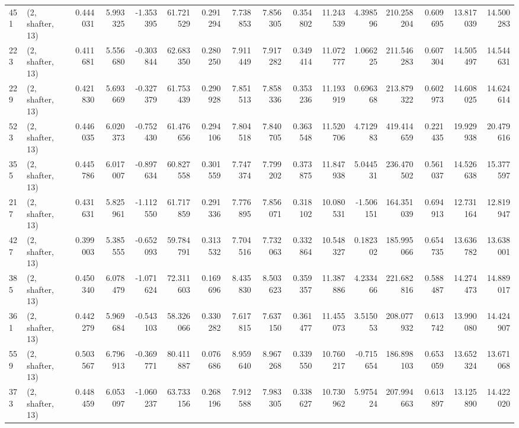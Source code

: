 \begin{tabular}{llrrrrrrrrrrrrrr}
451 &  (2, shafter, 13) &   0.444031 &   5.993325 &  -1.353395 &    61.721529 &   0.291294 &   7.738853 &   7.856305 &  0.354802 &  11.243539 &   4.398596 &   210.258204 &  0.609695 &  13.817039 &  14.500283 \\
223 &  (2, shafter, 13) &   0.411681 &   5.556680 &  -0.303844 &    62.683350 &   0.280250 &   7.911449 &   7.917282 &  0.349414 &  11.072777 &   1.066225 &   211.546283 &  0.607304 &  14.505497 &  14.544631 \\
229 &  (2, shafter, 13) &   0.421830 &   5.693669 &  -0.327379 &    61.753439 &   0.290928 &   7.851513 &   7.858336 &  0.353236 &  11.193919 &   0.696368 &   213.879322 &  0.602973 &  14.608025 &  14.624614 \\
523 &  (2, shafter, 13) &   0.446035 &   6.020373 &  -0.752430 &    61.476656 &   0.294106 &   7.804518 &   7.840705 &  0.363548 &  11.520706 &   4.712983 &   419.414659 &  0.221435 &  19.929938 &  20.479616 \\
355 &  (2, shafter, 13) &   0.445786 &   6.017007 &  -0.897634 &    60.827558 &   0.301559 &   7.747374 &   7.799202 &  0.373875 &  11.847938 &   5.044531 &   236.470502 &  0.561037 &  14.526638 &  15.377597 \\
217 &  (2, shafter, 13) &   0.431631 &   5.825961 &  -1.112550 &    61.717859 &   0.291336 &   7.776895 &   7.856071 &  0.318102 &  10.080531 &  -1.506151 &   164.351039 &  0.694913 &  12.731164 &  12.819947 \\
427 &  (2, shafter, 13) &   0.399003 &   5.385555 &  -0.652093 &    59.784791 &   0.313532 &   7.704516 &   7.732063 &  0.332864 &  10.548327 &   0.182302 &   185.995066 &  0.654735 &  13.636782 &  13.638001 \\
385 &  (2, shafter, 13) &   0.450340 &   6.078479 &  -1.071624 &    72.311603 &   0.169696 &   8.435830 &   8.503623 &  0.359357 &  11.387886 &   4.233466 &   221.682816 &  0.588487 &  14.274473 &  14.889017 \\
361 &  (2, shafter, 13) &   0.442279 &   5.969684 &  -0.543103 &    58.326066 &   0.330282 &   7.617815 &   7.637150 &  0.361477 &  11.455073 &   3.515053 &   208.077932 &  0.613742 &  13.990080 &  14.424907 \\
559 &  (2, shafter, 13) &   0.503567 &   6.796913 &  -0.369771 &    80.411887 &   0.076686 &   8.959640 &   8.967268 &  0.339550 &  10.760217 &  -0.715654 &   186.898103 &  0.653059 &  13.652324 &  13.671068 \\
373 &  (2, shafter, 13) &   0.448459 &   6.053097 &  -1.060237 &    63.733156 &   0.268196 &   7.912588 &   7.983305 &  0.338627 &  10.730962 &   5.975424 &   207.994663 &  0.613897 &  13.125890 &  14.422020 \\

\end{tabular}
